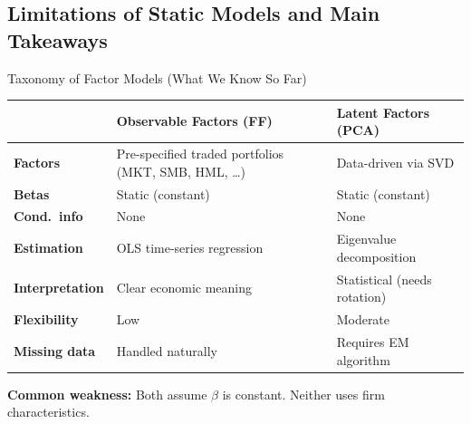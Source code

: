 \documentclass[aspectratio=169]{beamer}
\begin{document}
\subsection{Limitations of Static Models and Main Takeaways}
%
\begin{frame}{Taxonomy of Factor Models (What We Know So Far)}

\begin{center}
\renewcommand{\arraystretch}{1.5}
\begin{tabular}{p{3.0cm} p{4.5cm} p{4.5cm}}
\toprule
 & \textbf{Observable Factors (FF)} & \textbf{Latent Factors (PCA)} \\
\midrule
\textbf{Factors} & Pre-specified traded portfolios (MKT, SMB, HML, \ldots) & Data-driven via SVD \\
\textbf{Betas} & Static (constant) & Static (constant) \\
\textbf{Cond.\ info} & None & None \\
\textbf{Estimation} & OLS time-series regression & Eigenvalue decomposition \\
\textbf{Interpretation} & Clear economic meaning & Statistical (needs rotation) \\
\textbf{Flexibility} & Low & Moderate \\
\textbf{Missing data} & Handled naturally & Requires EM algorithm \\
\bottomrule
\end{tabular}
\end{center}

\vspace{0.3em}
\textbf{Common weakness:} Both assume $\beta$ is constant. Neither uses firm characteristics.
\end{frame}
%
%
\end{document}
